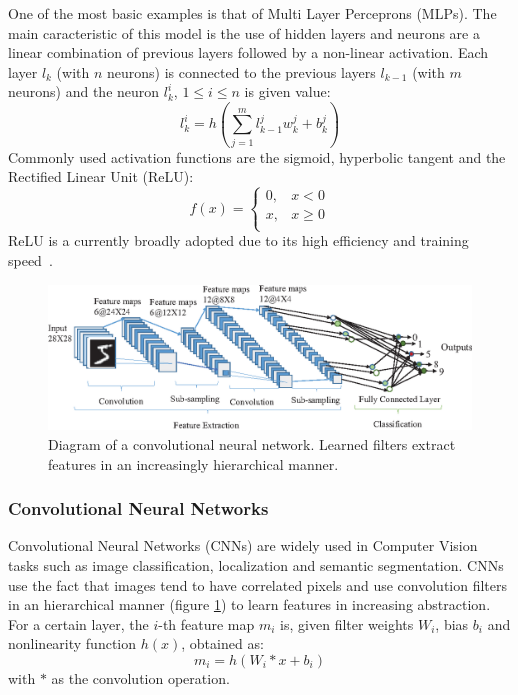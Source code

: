 \documentclass[English]{style/ic-tese-v3}
\begin{document}
One of the most basic examples is that of Multi Layer Perceprons (MLPs).
The main caracteristic of this model is the use of hidden layers
and neurons are a linear combination of previous layers followed by
a non-linear activation.
Each layer $l_k$ (with $n$ neurons) is connected to the previous layers
$l_{k-1}$ (with $m$ neurons) and the neuron $l_k^i$, $1 \le i \le n$
is given value:
$$l_k^i = h\left(\sum_{j=1}^{m} l_{k-1}^jw_k^j + b_k^j\right)$$
Commonly used activation functions are the sigmoid, hyperbolic tangent
and the Rectified Linear Unit (ReLU):
$$f(x) = \begin{cases}
    0, & x < 0 \\
    x, & x \ge 0 \\
        \end{cases}
$$
ReLU is a currently broadly adopted due to its high efficiency
and training speed~\cite{ref:relu}.

\begin{figure}
\begin{center}
    \includegraphics[width=0.9\linewidth]{./img/cnn2.png}
\caption{
    Diagram of a convolutional neural network.
    Learned filters extract features in an increasingly hierarchical manner.
}
\label{fig:cnn}
\end{center}
\end{figure}

\subsubsection{Convolutional Neural Networks}
Convolutional Neural Networks (CNNs) are widely used in Computer Vision
tasks such as image classification, localization and semantic segmentation.
CNNs use the fact that images tend to have correlated pixels and use
convolution filters in an hierarchical manner (figure \ref{fig:cnn})
to learn features in increasing abstraction.
For a certain layer, the $i$-th feature map $m_i$ is,
given filter weights $W_i$, bias $b_i$ and nonlinearity function $h(x)$,
obtained as:
$$m_i = h\left(W_i * x + b_i\right)$$
with $*$ as the convolution operation.
\end{document}
